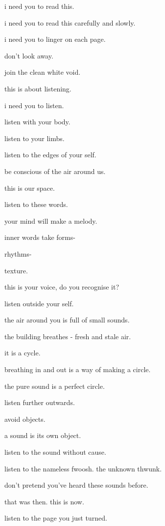 \documentclass{article}
\begin{document}
	i need you to read this.

	i need you to read this carefully and slowly.

	\newpage
	i need you to linger on each page.

	don't look away.

	join the clean white void.

	\newpage

	this is about listening.

	i need you to listen.
	\newpage

	listen with your body.

	listen to your limbs.

	listen to the edges of your self.

	be conscious of the air around us. 

	this is our space.

	\newpage

	listen to these words.

	your mind will make a melody.\newpage

	inner words take forms-

	rhythms-

	texture.\newpage

	this is your voice, do you recognise it?

	\newpage

	listen outside your self.

	the air around you is full of small sounds.

	the building breathes - fresh and stale air.

	it is a cycle.\newpage

	breathing in and out is a way of making a circle.

	the pure sound is a perfect circle.

	\newpage

	listen further outwards. 
	
	avoid objects.\newpage

	a sound is its own object.

	listen to the sound without cause.

	listen to the nameless fwoosh. the unknown thwunk.

	don't pretend you've heard these sounds before.

	that was then. this is now.

	\newpage

	listen to the page you just turned.
\end{document}
